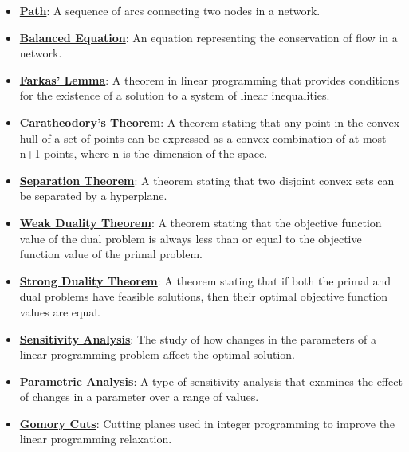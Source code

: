 \documentclass{article}%
\begin{document}
\begin{itemize}[leftmargin=*]
\item \href{https://www.math.purdue.edu/~yipn/421/2024-11-14-NetAppls.pdf#page=13}{\textbf{Path}}: A sequence of arcs connecting two nodes in a network.%
\item \href{https://www.math.purdue.edu/~yipn/421/2024-11-14-NetAppls.pdf#page=7}{\textbf{Balanced Equation}}: An equation representing the conservation of flow in a network.%
\item \href{https://www.math.purdue.edu/~yipn/421/2024-11-14-NetAppls.pdf#page=7}{\textbf{Farkas' Lemma}}: A theorem in linear programming that provides conditions for the existence of a solution to a system of linear inequalities.%
\item \href{https://www.math.purdue.edu/~yipn/421/2024-11-14-NetAppls.pdf#page=7}{\textbf{Caratheodory's Theorem}}: A theorem stating that any point in the convex hull of a set of points can be expressed as a convex combination of at most n+1 points, where n is the dimension of the space.%
\item \href{https://www.math.purdue.edu/~yipn/421/2024-11-14-NetAppls.pdf#page=7}{\textbf{Separation Theorem}}: A theorem stating that two disjoint convex sets can be separated by a hyperplane.%
\item \href{https://www.math.purdue.edu/~yipn/421/2024-11-14-NetAppls.pdf#page=7}{\textbf{Weak Duality Theorem}}: A theorem stating that the objective function value of the dual problem is always less than or equal to the objective function value of the primal problem.%
\item \href{https://www.math.purdue.edu/~yipn/421/2024-11-14-NetAppls.pdf#page=7}{\textbf{Strong Duality Theorem}}: A theorem stating that if both the primal and dual problems have feasible solutions, then their optimal objective function values are equal.%
\item \href{https://www.math.purdue.edu/~yipn/421/2024-11-14-NetAppls.pdf#page=7}{\textbf{Sensitivity Analysis}}: The study of how changes in the parameters of a linear programming problem affect the optimal solution.%
\item \href{https://www.math.purdue.edu/~yipn/421/2024-11-14-NetAppls.pdf#page=7}{\textbf{Parametric Analysis}}: A type of sensitivity analysis that examines the effect of changes in a parameter over a range of values.%
\item \href{https://www.math.purdue.edu/~yipn/421/2024-11-14-NetAppls.pdf#page=7}{\textbf{Gomory Cuts}}: Cutting planes used in integer programming to improve the linear programming relaxation.%

\end{itemize}
\end{document}
